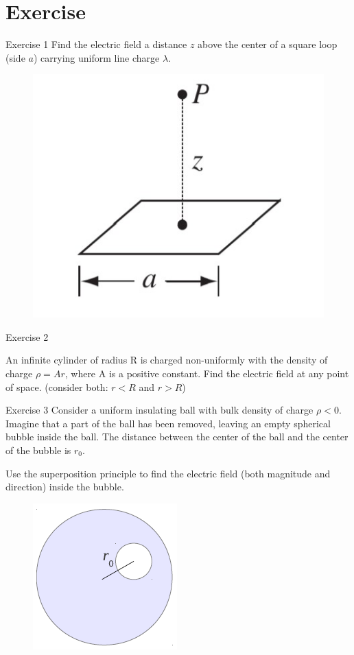 \documentclass{beamer}
\begin{document}
\section{Exercise}

\begin{frame}{Exercise 1}
	Find the electric field a distance $z$ above the center of a square loop (side $a$) carrying uniform line charge $\lambda$.
	\begin{figure}[htbp]
		\centering
		\includegraphics{Images/ex1.jpg}
	\end{figure}
\end{frame}

\begin{frame}{Exercise 2}

An infinite cylinder of radius R is charged non-uniformly
with the density of charge $\rho=Ar$, where A is a positive
constant. Find the electric field at any point of space.
(consider both: $r<R$ and $r>R$)

\end{frame}

\begin{frame}{Exercise 3}
	Consider a uniform insulating ball with bulk density of charge $\rho < 0$. Imagine that a part of the ball has been removed, leaving an empty spherical bubble inside the ball. The distance between the center of the ball and the center of the bubble is $r_0$.

	Use the superposition principle to find the electric field (both magnitude and direction) inside the
	bubble.
	\begin{figure}[H]
		\centering
		\includegraphics{Images/E2.png}
	\end{figure}
\end{frame}
\end{document}
